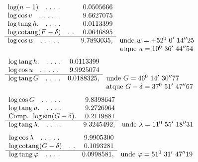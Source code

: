 \[
\begin{array}{lrl}
\log(n-1)\quad .\ .\ .\ .&0.0505666&\\
\log\cos v\quad .\ .\ .\ .\ .&9.6627075&\\
\log\operatorname{tang}h.\quad .\ .\ .\ .&0.0113399&\\
\log\operatorname{cotang}(F-\delta)\quad .\ .&0.0646895&\\\cline{1-2}
\log\cos w\quad .\ .\ .\ .\ .&9.7893035,&\text{unde }w=+52^0\ 0'\ 14''25\\
&&\text{atque }u=10^0\ 36'\ 44''54
\end{array}
\]
\[
\begin{array}{lrl}
\log\operatorname{tang}h.\quad .\ .\ .\ .&0.0113399&\\
\log\cos u\quad .\ .\ .\ .\ .&9.9925074&\\\cline{1-2}
\log\operatorname{tang}G\quad .\ .\ .\ .&0.0188325,&\text{unde }G=46^0\ 14'\ 30''77\\
&&\text{atque }G-\delta=37^0\ 51'\ 47''67
\end{array}
\]
\[
\begin{array}{lrl}
\log\cos G\quad .\ .\ .\ .\ .&9.8398647&\\
\log\operatorname{tang}u.\quad .\ .\ .\ .&9.2726964&\\
\text{Comp. }\log\sin(G-\delta).&0.2119881&\\\cline{1-2}
\log\operatorname{tang}\lambda.\quad .\ .\ .\ .&9.3245492,&\text{unde }\lambda=11^0\ 55'\ 18''31
\end{array}
\]
\[
\begin{array}{lrl}
\log\cos\lambda\quad .\ .\ .\ .\ .&9.9905300&\\
\log\operatorname{cotang}(G-\delta)\quad .\ .&0.1093281&\\\cline{1-2}
\log\operatorname{tang}\varphi\quad .\ .\ .\ .&0.0998581,&\text{unde }\varphi=51^0\ 31'\ 47''19
\end{array}
\]


